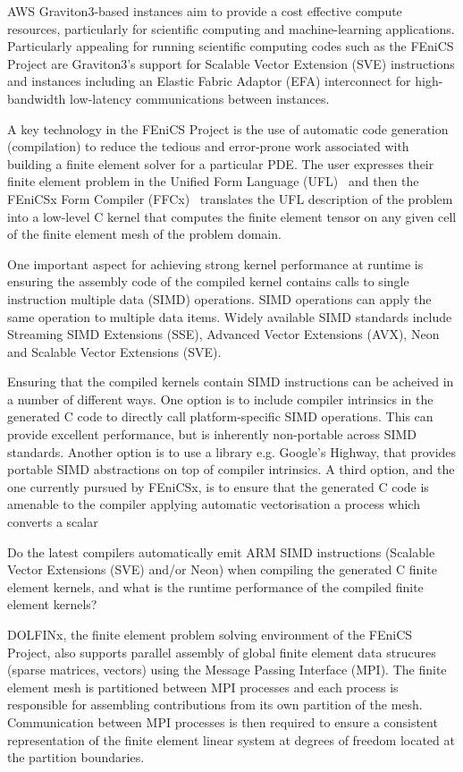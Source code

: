 AWS Graviton3-based instances aim to provide a cost effective compute
resources, particularly for scientific computing and machine-learning
applications. Particularly appealing for running scientific computing codes
such as the FEniCS Project are Graviton3's support for Scalable Vector
Extension (SVE) instructions and instances including an Elastic Fabric Adaptor
(EFA) interconnect for high-bandwidth low-latency communications between
instances.

A key technology in the FEniCS Project is the use of automatic code generation
(compilation) to reduce the tedious and error-prone work associated with
building a finite element solver for a particular PDE. The user expresses their
finite element problem in the Unified Form Language
(UFL)~\cite{alnaes_unified_2014} and then the FEniCSx Form Compiler
(FFCx)~\cite{kirby_compiler_2006} translates the UFL description of the problem
into a low-level C kernel that computes the finite element tensor on any given
cell of the finite element mesh of the problem domain.

One important aspect for achieving strong kernel performance at runtime is
ensuring the assembly code of the compiled kernel contains calls to single
instruction multiple data (SIMD) operations. SIMD operations can apply the same
operation to multiple data items. Widely available SIMD standards include
Streaming SIMD Extensions (SSE), Advanced Vector Extensions (AVX), Neon and
Scalable Vector Extensions (SVE). 

Ensuring that the compiled kernels contain SIMD instructions can be acheived in
a number of different ways. One option is to include compiler intrinsics in the
generated C code to directly call platform-specific SIMD operations. This can
provide excellent performance, but is inherently non-portable across SIMD
standards. Another option is to use a library e.g. Google's Highway, that
provides portable SIMD abstractions on top of compiler intrinsics. A third
option, and the one currently pursued by FEniCSx, is to ensure that the
generated C code is amenable to the compiler applying automatic vectorisation
a process which converts a scalar

Do the latest compilers automatically emit ARM SIMD instructions (Scalable
Vector Extensions (SVE) and/or Neon) when compiling the generated C finite
element kernels, and what is the runtime performance of the compiled
finite element kernels?

DOLFINx, the finite element problem solving environment of the FEniCS Project,
also supports parallel assembly of global finite element data strucures (sparse
matrices, vectors) using the Message Passing Interface (MPI). The finite
element mesh is partitioned between MPI processes and each process is
responsible for assembling contributions from its own partition of the mesh.
Communication between MPI processes is then required to ensure a consistent
representation of the finite element linear system at degrees of freedom
located at the partition boundaries.

